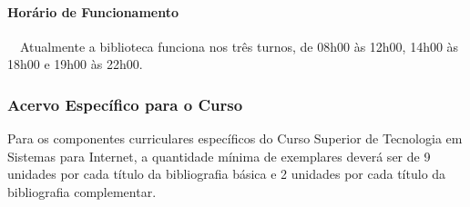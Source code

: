 \paragraph{Horário de Funcionamento}\
\
Atualmente a biblioteca funciona nos três turnos, de 08h00 às 12h00, 14h00 às 18h00 e 19h00 às 22h00.


\subsubsection{Acervo Específico para o Curso}

Para os componentes curriculares específicos do Curso Superior de Tecnologia em Sistemas para Internet, a quantidade mínima de exemplares deverá ser de 9 unidades por cada título da bibliografia básica e 2 unidades por cada título da bibliografia complementar.

